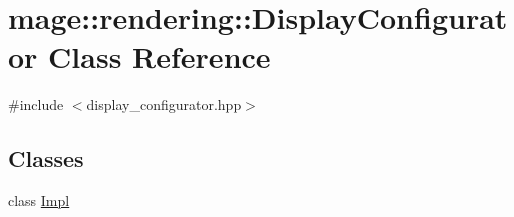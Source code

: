 \hypertarget{classmage_1_1rendering_1_1_display_configurator}{}\section{mage\+:\+:rendering\+:\+:Display\+Configurator Class Reference}
\label{classmage_1_1rendering_1_1_display_configurator}


{\ttfamily \#include $<$display\+\_\+configurator.\+hpp$>$}

\subsection*{Classes}
\begin{DoxyCompactItemize}
\item 
class \hyperlink{classmage_1_1rendering_1_1_display_configurator_1_1_impl}{Impl}
\end{DoxyCompactItemize}
